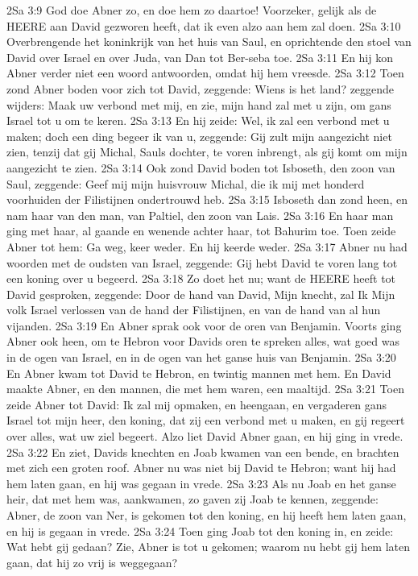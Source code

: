 2Sa 3:9  God doe Abner zo, en doe hem zo daartoe! Voorzeker, gelijk als de HEERE aan David gezworen heeft, dat ik even alzo aan hem zal doen.
2Sa 3:10  Overbrengende het koninkrijk van het huis van Saul, en oprichtende den stoel van David over Israel en over Juda, van Dan tot Ber-seba toe.
2Sa 3:11  En hij kon Abner verder niet een woord antwoorden, omdat hij hem vreesde.
2Sa 3:12  Toen zond Abner boden voor zich tot David, zeggende: Wiens is het land? zeggende wijders: Maak uw verbond met mij, en zie, mijn hand zal met u zijn, om gans Israel tot u om te keren.
2Sa 3:13  En hij zeide: Wel, ik zal een verbond met u maken; doch een ding begeer ik van u, zeggende: Gij zult mijn aangezicht niet zien, tenzij dat gij Michal, Sauls dochter, te voren inbrengt, als gij komt om mijn aangezicht te zien.
2Sa 3:14  Ook zond David boden tot Isboseth, den zoon van Saul, zeggende: Geef mij mijn huisvrouw Michal, die ik mij met honderd voorhuiden der Filistijnen ondertrouwd heb.
2Sa 3:15  Isboseth dan zond heen, en nam haar van den man, van Paltiel, den zoon van Lais.
2Sa 3:16  En haar man ging met haar, al gaande en wenende achter haar, tot Bahurim toe. Toen zeide Abner tot hem: Ga weg, keer weder. En hij keerde weder.
2Sa 3:17  Abner nu had woorden met de oudsten van Israel, zeggende: Gij hebt David te voren lang tot een koning over u begeerd.
2Sa 3:18  Zo doet het nu; want de HEERE heeft tot David gesproken, zeggende: Door de hand van David, Mijn knecht, zal Ik Mijn volk Israel verlossen van de hand der Filistijnen, en van de hand van al hun vijanden.
2Sa 3:19  En Abner sprak ook voor de oren van Benjamin. Voorts ging Abner ook heen, om te Hebron voor Davids oren te spreken alles, wat goed was in de ogen van Israel, en in de ogen van het ganse huis van Benjamin.
2Sa 3:20  En Abner kwam tot David te Hebron, en twintig mannen met hem. En David maakte Abner, en den mannen, die met hem waren, een maaltijd.
2Sa 3:21  Toen zeide Abner tot David: Ik zal mij opmaken, en heengaan, en vergaderen gans Israel tot mijn heer, den koning, dat zij een verbond met u maken, en gij regeert over alles, wat uw ziel begeert. Alzo liet David Abner gaan, en hij ging in vrede.
2Sa 3:22  En ziet, Davids knechten en Joab kwamen van een bende, en brachten met zich een groten roof. Abner nu was niet bij David te Hebron; want hij had hem laten gaan, en hij was gegaan in vrede.
2Sa 3:23  Als nu Joab en het ganse heir, dat met hem was, aankwamen, zo gaven zij Joab te kennen, zeggende: Abner, de zoon van Ner, is gekomen tot den koning, en hij heeft hem laten gaan, en hij is gegaan in vrede.
2Sa 3:24  Toen ging Joab tot den koning in, en zeide: Wat hebt gij gedaan? Zie, Abner is tot u gekomen; waarom nu hebt gij hem laten gaan, dat hij zo vrij is weggegaan?
